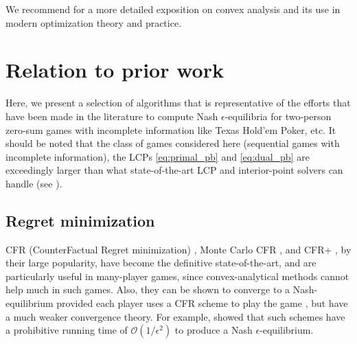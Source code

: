 \documentclass[a4paper,9pt]{extarticle}
\begin{document}
We recommend \cite{rockafellar1997convex,combettes2011proximal} for a
more detailed exposition on convex analysis and its use in
modern optimization theory and practice.

\section{Relation to prior work}
\label{sec:related_work}
Here, we present a selection of algorithms that is representative of the
efforts that have been made in the literature to compute Nash
$\epsilon$-equilibria for two-person zero-sum games with incomplete
information like Texas Hold'em Poker, etc.
It should be noted that the class of games considered
here (sequential games with incomplete information), the LCPs
\eqref{eq:primal_pb} and \eqref{eq:dual_pb} are exceedingly larger
than what state-of-the-art LCP and interior-point solvers can
handle (see \cite{hoda2010smoothing,gilpinfirst}).

\subsection{Regret minimization}
CFR (CounterFactual Regret minimization) \cite{zinkevich2008regret},
Monte Carlo CFR \cite{lanctot2009monte}, and CFR+
\cite{Bowling09012015}, by their large popularity, have become the
definitive state-of-the-art, and are particularly useful in
many-player games, since convex-analytical methods cannot help much in
such games. Also, they can be shown to converge to a Nash-equilibrium
provided each player uses a CFR scheme to play the game
\cite{zinkevich2008regret}, but have a much weaker
convergence theory. For example, \cite{lanctot2009monte} showed that
such schemes have a prohibitive running time of
$\mathcal{O}(1/\epsilon^2)$ to produce a Nash $\epsilon$-equilibrium.
\end{document}
